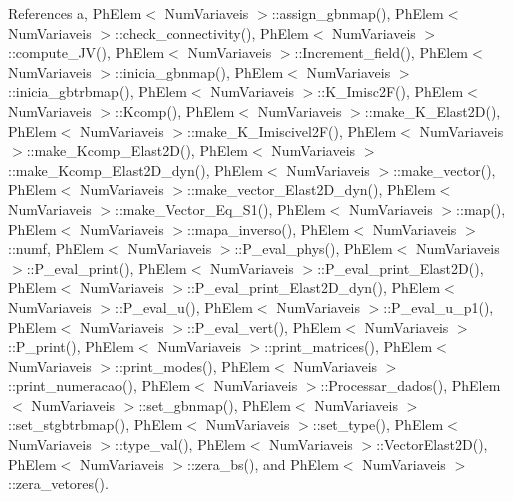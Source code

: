 References a, Ph\+Elem$<$ Num\+Variaveis $>$\+::assign\+\_\+gbnmap(), Ph\+Elem$<$ Num\+Variaveis $>$\+::check\+\_\+connectivity(), Ph\+Elem$<$ Num\+Variaveis $>$\+::compute\+\_\+\+J\+V(), Ph\+Elem$<$ Num\+Variaveis $>$\+::\+Increment\+\_\+field(), Ph\+Elem$<$ Num\+Variaveis $>$\+::inicia\+\_\+gbnmap(), Ph\+Elem$<$ Num\+Variaveis $>$\+::inicia\+\_\+gbtrbmap(), Ph\+Elem$<$ Num\+Variaveis $>$\+::\+K\+\_\+\+Imisc2\+F(), Ph\+Elem$<$ Num\+Variaveis $>$\+::\+Kcomp(), Ph\+Elem$<$ Num\+Variaveis $>$\+::make\+\_\+\+K\+\_\+\+Elast2\+D(), Ph\+Elem$<$ Num\+Variaveis $>$\+::make\+\_\+\+K\+\_\+\+Imiscivel2\+F(), Ph\+Elem$<$ Num\+Variaveis $>$\+::make\+\_\+\+Kcomp\+\_\+\+Elast2\+D(), Ph\+Elem$<$ Num\+Variaveis $>$\+::make\+\_\+\+Kcomp\+\_\+\+Elast2\+D\+\_\+dyn(), Ph\+Elem$<$ Num\+Variaveis $>$\+::make\+\_\+vector(), Ph\+Elem$<$ Num\+Variaveis $>$\+::make\+\_\+vector\+\_\+\+Elast2\+D\+\_\+dyn(), Ph\+Elem$<$ Num\+Variaveis $>$\+::make\+\_\+\+Vector\+\_\+\+Eq\+\_\+\+S1(), Ph\+Elem$<$ Num\+Variaveis $>$\+::map(), Ph\+Elem$<$ Num\+Variaveis $>$\+::mapa\+\_\+inverso(), Ph\+Elem$<$ Num\+Variaveis $>$\+::numf, Ph\+Elem$<$ Num\+Variaveis $>$\+::\+P\+\_\+eval\+\_\+phys(), Ph\+Elem$<$ Num\+Variaveis $>$\+::\+P\+\_\+eval\+\_\+print(), Ph\+Elem$<$ Num\+Variaveis $>$\+::\+P\+\_\+eval\+\_\+print\+\_\+\+Elast2\+D(), Ph\+Elem$<$ Num\+Variaveis $>$\+::\+P\+\_\+eval\+\_\+print\+\_\+\+Elast2\+D\+\_\+dyn(), Ph\+Elem$<$ Num\+Variaveis $>$\+::\+P\+\_\+eval\+\_\+u(), Ph\+Elem$<$ Num\+Variaveis $>$\+::\+P\+\_\+eval\+\_\+u\+\_\+p1(), Ph\+Elem$<$ Num\+Variaveis $>$\+::\+P\+\_\+eval\+\_\+vert(), Ph\+Elem$<$ Num\+Variaveis $>$\+::\+P\+\_\+print(), Ph\+Elem$<$ Num\+Variaveis $>$\+::print\+\_\+matrices(), Ph\+Elem$<$ Num\+Variaveis $>$\+::print\+\_\+modes(), Ph\+Elem$<$ Num\+Variaveis $>$\+::print\+\_\+numeracao(), Ph\+Elem$<$ Num\+Variaveis $>$\+::\+Processar\+\_\+dados(), Ph\+Elem$<$ Num\+Variaveis $>$\+::set\+\_\+gbnmap(), Ph\+Elem$<$ Num\+Variaveis $>$\+::set\+\_\+stgbtrbmap(), Ph\+Elem$<$ Num\+Variaveis $>$\+::set\+\_\+type(), Ph\+Elem$<$ Num\+Variaveis $>$\+::type\+\_\+val(), Ph\+Elem$<$ Num\+Variaveis $>$\+::\+Vector\+Elast2\+D(), Ph\+Elem$<$ Num\+Variaveis $>$\+::zera\+\_\+bs(), and Ph\+Elem$<$ Num\+Variaveis $>$\+::zera\+\_\+vetores().

\mbox{\label{classPhElem_a5288b2eba55ffa37f1a9866a516f6886}} 
